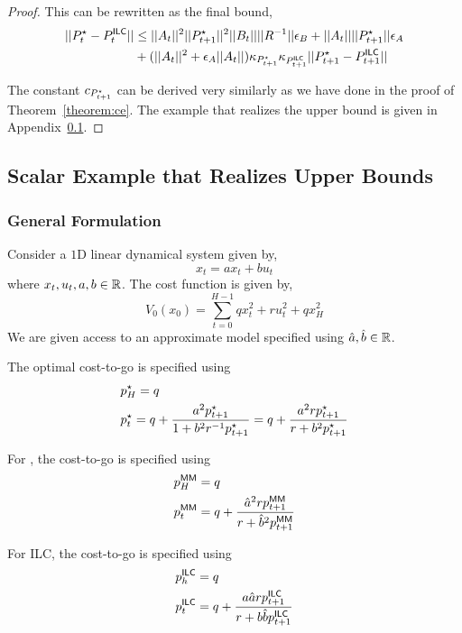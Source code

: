 \begin{proof}
This can be rewritten as the final bound,
\begin{align}
  \label{eq:91}
  ||P^\star_{t} - P^\mathsf{ILC}_{t}|| &\leq ||A_t||^{2}||P^\star_{t+1}||^{2}||B_t||||R^{-1}||\epsilon_B + ||A_t||||P^\star_{t+1}||\epsilon_A \nonumber\\
  &+ (||A_t||^{2} + \epsilon_A||A_t||) \kappa_{P^\star_{t+1}}\kappa_{P^\mathsf{ILC}_{t+1}} ||P^\star_{t+1} - P^\mathsf{ILC}_{t+1}||
\end{align}

The constant $c_{P^\star_{t+1}}$ can be derived very similarly as we
have done in the proof of Theorem~\ref{theorem:ce}. The example that
realizes the upper bound is given in Appendix~\ref{sec:scalar-example-that}.
\end{proof}

\subsection{Scalar Example that Realizes Upper Bounds}
\label{sec:scalar-example-that}

\subsubsection{General Formulation}
\label{sec:general-formulation}
Consider a $1$D linear dynamical system given by,
\begin{equation}
  \label{eq:10}
  x_t = ax_t + bu_t
\end{equation}
where $x_t, u_t, a, b \in \mathbb{R}$. The cost function is given by,
\begin{equation}
  \label{eq:11}
  V_0(x_0) = \sum_{t=0}^{H-1} qx_t^2 + ru_t^2 + qx_H^2
\end{equation}
We are given access to an approximate model specified using $\hat{a},
\hat{b} \in \mathbb{R}$.

The optimal cost-to-go is specified using
\begin{align}
  \label{eq:12}
  &p^\star_H = q \\
  &p^\star_t = q + \frac{a^2p^\star_{t+1}}{1 + b^2r^{-1}p^\star_{t+1}} = q + \frac{a^2rp^\star_{t+1}}{r + b^2p^\star_{t+1}}
\end{align}

For \MM{}, the cost-to-go is specified using
\begin{align}
  \label{eq:13}
  &p^\mathsf{MM}_H = q \\
  &p^\mathsf{MM}_t = q + \frac{\hat{a}^2rp^\mathsf{MM}_{t+1}}{r + \hat{b}^2p^\mathsf{MM}_{t+1}}
\end{align}

For ILC, the cost-to-go is specified using
\begin{align}
  \label{eq:8}
  &p^\mathsf{ILC}_h = q \\
  &p^\mathsf{ILC}_t = q + \frac{a\hat{a} rp^\mathsf{ILC}_{t+1}}{r + b\hat{b}p^\mathsf{ILC}_{t+1}}
\end{align}

